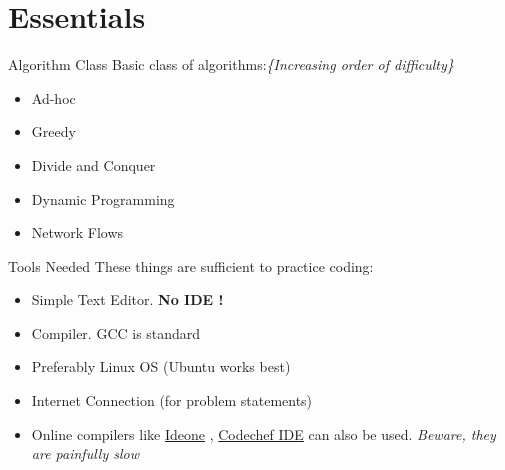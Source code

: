 \documentclass{beamer}
\begin{document}
	\section{Essentials}
		\begin{frame}{Algorithm Class}
			Basic class of algorithms:\textit{\{Increasing order of difficulty\}}
			\pause
			\begin{itemize}
				\item<+-> Ad-hoc
				\item<+-> Greedy
				\item<+-> Divide and Conquer
				\item<+-> Dynamic Programming
				\item<+-> Network Flows
			\end{itemize}
		\end{frame}
		\begin{frame}{Tools Needed}
			These things are sufficient to practice coding:	
			\pause
			\begin{itemize}
			\item<+-> Simple Text Editor. \textbf{No IDE !}
			\item<+-> Compiler. GCC is standard
			\item<+-> Preferably Linux OS (Ubuntu works best)
			\item<+-> Internet Connection (for problem statements)
			\item<+-> Online compilers like \href{https://www.ideone.com/}{Ideone} ,
						\href{https://www.codechef.com/ide}{Codechef IDE} can also be used.
						\textit{Beware, they are painfully slow}
			\end{itemize}
		\end{frame}
\end{document}

